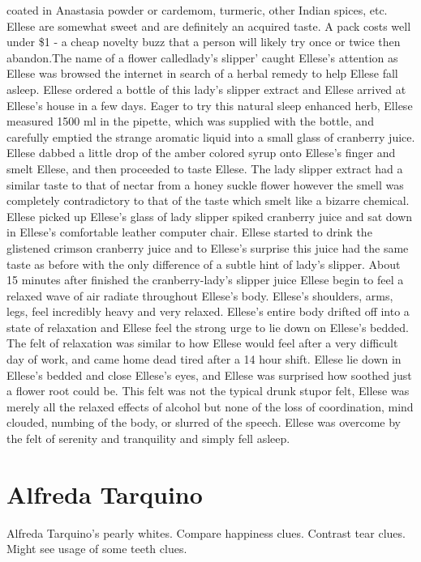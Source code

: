 \documentclass[12pt]{book}
\begin{document}
coated in Anastasia powder or cardemom, turmeric, other Indian spices, etc. Ellese are somewhat sweet and are definitely an acquired taste. A pack costs well under \$1 - a cheap novelty buzz that a person will likely try once or twice then abandon.The name of a flower calledlady's slipper' caught Ellese's attention as Ellese was browsed the internet in search of a herbal remedy to help Ellese fall asleep. Ellese ordered a bottle of this lady's slipper extract and Ellese arrived at Ellese's house in a few days. Eager to try this natural sleep enhanced herb, Ellese measured 1500 ml in the pipette, which was supplied with the bottle, and carefully emptied the strange aromatic liquid into a small glass of cranberry juice. Ellese dabbed a little drop of the amber colored syrup onto Ellese's finger and smelt Ellese, and then proceeded to taste Ellese. The lady slipper extract had a similar taste to that of nectar from a honey suckle flower however the smell was completely contradictory to that of the taste which smelt like a bizarre chemical. Ellese picked up Ellese's glass of lady slipper spiked cranberry juice and sat down in Ellese's comfortable leather computer chair. Ellese started to drink the glistened crimson cranberry juice and to Ellese's surprise this juice had the same taste as before with the only difference of a subtle hint of lady's slipper. About 15 minutes after finished the cranberry-lady's slipper juice Ellese begin to feel a relaxed wave of air radiate throughout Ellese's body. Ellese's shoulders, arms, legs, feel incredibly heavy and very relaxed. Ellese's entire body drifted off into a state of relaxation and Ellese feel the strong urge to lie down on Ellese's bedded. The felt of relaxation was similar to how Ellese would feel after a very difficult day of work, and came home dead tired after a 14 hour shift. Ellese lie down in Ellese's bedded and close Ellese's eyes, and Ellese was surprised how soothed just a flower root could be. This felt was not the typical drunk stupor felt, Ellese was merely all the relaxed effects of alcohol but none of the loss of coordination, mind clouded, numbing of the body, or slurred of the speech. Ellese was overcome by the felt of serenity and tranquility and simply fell asleep.



\chapter{Alfreda Tarquino}

Alfreda Tarquino's pearly whites. Compare happiness clues. Contrast tear clues. Might see usage of some teeth clues.
\end{document}
